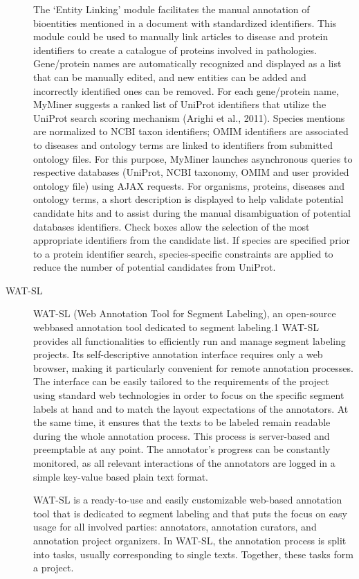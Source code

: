 \begin{description}
    The ‘Entity Linking’ module facilitates the manual annotation of bioentities mentioned in a document with standardized identifiers. This module could be used to manually link articles to disease and protein identifiers to create a catalogue of proteins involved in pathologies. Gene/protein names are automatically recognized and displayed as a list that can be manually edited, and new entities can be added and incorrectly identified ones can be removed. For each gene/protein name, MyMiner suggests a ranked list of UniProt identifiers that utilize the UniProt search scoring mechanism (Arighi et al., 2011). Species mentions are normalized to NCBI taxon identifiers; OMIM identifiers are associated to diseases and ontology terms are linked to identifiers from submitted ontology files. For this purpose, MyMiner launches asynchronous queries to respective databases (UniProt, NCBI taxonomy, OMIM and user provided ontology file) using AJAX requests. For organisms, proteins, diseases and ontology terms, a short description is displayed to help validate potential candidate hits and to assist during the manual disambiguation of potential databases identifiers. Check boxes allow the selection of the most appropriate identifiers from the candidate list. If species are specified prior to a protein identifier search, species-specific constraints are applied to reduce the number of potential candidates from UniProt.

    \item[WAT-SL]
    WAT-SL (Web Annotation
    Tool for Segment Labeling), an open-source webbased annotation tool dedicated to segment labeling.1 WAT-SL provides all functionalities to efficiently run and manage segment labeling projects.
    Its self-descriptive annotation interface requires
    only a web browser, making it particularly convenient for remote annotation processes. The interface can be easily tailored to the requirements of
    the project using standard web technologies in order to focus on the specific segment labels at hand
    and to match the layout expectations of the annotators. At the same time, it ensures that the texts
    to be labeled remain readable during the whole
    annotation process. This process is server-based
    and preemptable at any point. The annotator’s
    progress can be constantly monitored, as all relevant interactions of the annotators are logged in a
    simple key-value based plain text format.

    WAT-SL is a ready-to-use and easily customizable
    web-based annotation tool that is dedicated to segment labeling and that puts the focus on easy usage for all involved parties: annotators, annotation
    curators, and annotation project organizers.
    In WAT-SL, the annotation process is split into
tasks, usually corresponding to single texts. Together, these tasks form a project.


\end{description}
